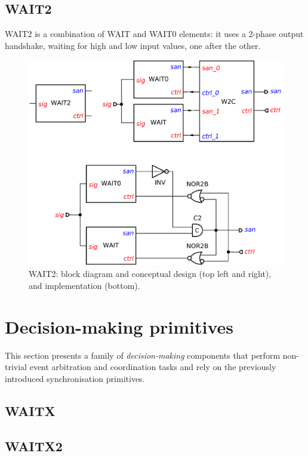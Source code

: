\documentclass[conference]{IEEEtran}
\begin{document}
\subsection{\textsf{WAIT2}}
\textsf{WAIT2} is a combination of \textsf{WAIT} and \textsf{WAIT0} elements:
it uses a 2-phase output handshake, waiting for high and low input values, one after
the other.

\begin{figure}
\begin{center}
    \includegraphics[scale=0.23]{fig/WAIT2.pdf}
    \caption{\textsf{WAIT2}: block diagram and conceptual design (top left and right),
    and implementation (bottom).}
    \label{fig:wait2}
\end{center}
\end{figure}

\section{Decision-making primitives}\label{sec-decision}

This section presents a family of \emph{decision-making} components that perform
non-trivial event arbitration and coordination tasks and rely on the previously
introduced synchronisation primitives.

\subsection{WAITX}
\subsection{WAITX2}
\end{document}
